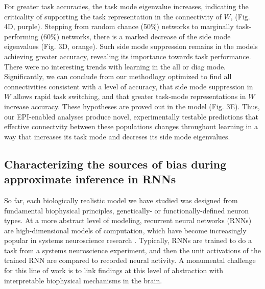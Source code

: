 \documentclass[11pt]{article}
\begin{document}
For greater task accuracies, the task mode eigenvalue increases, indicating the criticality of supporting the task representation in the connectivity of $W$, (Fig. 4D, purple).  Stepping from random chance (50\%) networks to marginally task-performing (60\%) networks, there is a marked decrease of the side mode eigenvalues (Fig. 3D, orange).  Such side mode suppression remains in the models achieving greater accuracy, revealing its importance towards task performance.   There were no interesting trends with learning in the all or diag mode. Significantly, we can conclude from our methodlogy optimized to find all connectivities consistent with a level of accuracy, that side mode suppression in $W$ allows rapid task switching, and that greater task-mode representations in $W$ increase accuracy.  These hypotheses are proved out in the model (Fig. 3E).  Thus, our EPI-enabled analyses produce novel, experimentally testable predictions that effective connectvity between these populations changes throughout learning in a way that increases its task mode and decreses its side mode eigenvalues.

\subsection{Characterizing the sources of bias during approximate inference in RNNs} \label{results_RNN}
So far, each biologically realistic model we have studied was designed from fundamental biophysical principles, genetically- or functionally-defined neuron types.  
At a more abstract level of modeling, recurrent neural networks (RNNs) are high-dimensional models of computation, which have become increasingly popular in systems neuroscience research \cite{barak2017recurrent}. 
Typically, RNNs are trained to do a task from a systems neuroscience experiment, and then the unit activations of the trained RNN are compared to recorded neural activity. 
A monumental challenge for this line of work is to link findings at this level of abstraction with interpretable biophysical mechanisms in the brain.
 
\end{document}
